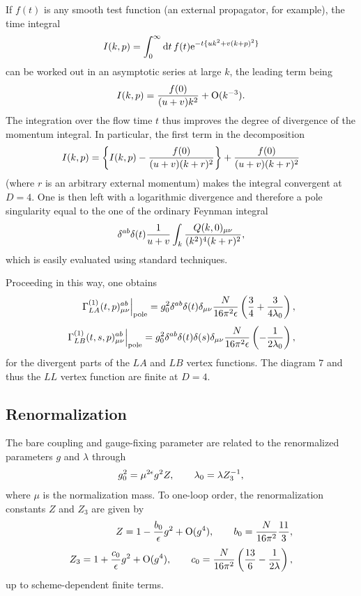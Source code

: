 If $f(t)$ is any smooth test function (an external propagator, for
example), the time integral
\begin{equation}
   I(k,p)=\int_{0}^{\infty}\mathrm{d} t\, f(t)\mathrm{e}^{-t\{uk^2+v(k+p)^2\}}
\label{eq:5.3}
\end{equation}
can be worked out in an asymptotic series at large $k$,
the leading term being
\begin{equation}
   I(k,p)={f(0)\over(u+v)k^2}+\mathrm{O}(k^{-3}).
\label{eq:5.4}
\end{equation}
The integration over the flow time $t$ thus improves the degree of
divergence of the momentum integral. In particular, the first term
in the decomposition
\begin{equation}
   I(k,p)=\left\{I(k,p)-{f(0)\over(u+v)(k+r)^2}\right\}+
   {f(0)\over(u+v)(k+r)^2}
   \label{eq:5.5}
\end{equation}
(where $r$ is an arbitrary external momentum) makes the integral
convergent at $D=4$.
One is then left with a logarithmic divergence and
therefore a pole singularity equal to
the one of the ordinary Feynman integral
\begin{equation}
   \delta^{ab}\delta(t){1\over u+v}\int_k
   {Q(k,0)_{\mu\nu}\over(k^2)^4(k+r)^2},
   \label{eq:5.6}
\end{equation}
which is easily evaluated using standard techniques.

Proceeding in this way, one obtains
\begin{align}
   \left.\Gamma^{(1)}_{LA}(t,p)_{\mu\nu}^{ab}
   \right|_{\rm pole}
   =g_0^2\delta^{ab}\delta(t)\delta_{\mu\nu}
   {N\over16\pi^2\epsilon}
   \left({3\over4}+{3\over 4\lambda_0}\right),
   \label{eq:5.7}\\[3.5pt]
   \left.\Gamma^{(1)}_{LB}(t,s,p)_{\mu\nu}^{ab}
   \right|_{\rm pole}
   =g_0^2\delta^{ab}\delta(t)\delta(s)\delta_{\mu\nu}
   {N\over16\pi^2\epsilon}\left(-{1\over 2\lambda_0}\right),
   \label{eq:5.8}
\end{align}
for the divergent parts of the $LA$ and $LB$ vertex functions.
The diagram $7$
and thus the $LL$ vertex function are finite at $D=4$.

\subsection{Renormalization}

The bare coupling and gauge-fixing parameter are
related to the renormalized parameters $g$ and $\lambda$
through
\begin{equation}
   g_0^2=\mu^{2\epsilon}g^2Z,
   \qquad
   \lambda_0=\lambda Z_3^{-1},
   \label{eq:5.9}
\end{equation}
where $\mu$ is the normalization mass.
To one-loop order, the renormalization constants
$Z$ and $Z_3$ are given by
\begin{align}
   Z=1-{b_0\over\epsilon}g^2+\mathrm{O}(g^4),
   \qquad
   b_0={N\over16\pi^2}{11\over3},
   \label{eq:5.10}\\[3pt]
   Z_3=1+{c_0\over\epsilon}g^2+\mathrm{O}(g^4),
   \qquad
   c_0={N\over16\pi^2}\left({13\over6}-{1\over2\lambda}\right),
   \label{eq:5.11}
\end{align}
up to scheme-dependent finite terms.

